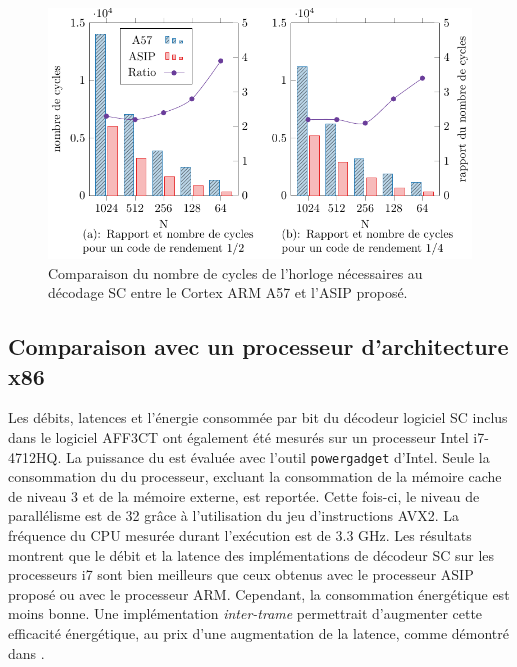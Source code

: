 \begin{figure}[htp]
\centering
\includegraphics{main/ch3_fig/curves/cycle_count/cycle_count}
\caption{Comparaison du nombre de cycles de l'horloge nécessaires au décodage SC entre le Cortex ARM A57 et l'ASIP proposé.}
\label{fig:cycle_count}
\end{figure}

\subsection{Comparaison avec un processeur d'architecture x86}
Les débits, latences et l'énergie consommée par bit du décodeur logiciel SC inclus dans le logiciel AFF3CT ont également été mesurés sur un processeur Intel i7-4712HQ.
La puissance du \coeur est évaluée avec l'outil \texttt{powergadget} d'Intel. Seule la consommation du \coeur du processeur, excluant la consommation de la mémoire cache de niveau 3 et de la mémoire externe, est reportée. Cette fois-ci, le niveau de parallélisme est de 32 grâce à l'utilisation du jeu d'instructions AVX2. La fréquence du CPU mesurée durant l'exécution est de 3.3 GHz. Les résultats montrent que le débit et la latence des implémentations de décodeur SC sur les processeurs i7 sont bien meilleurs que ceux obtenus avec le processeur ASIP proposé ou avec le processeur ARM. Cependant, la consommation énergétique est moins bonne. Une implémentation \textit{inter-trame} permettrait d'augmenter cette efficacité énergétique, au prix d'une augmentation de la latence, comme démontré dans \cite{cassagne_energy_2016}.


